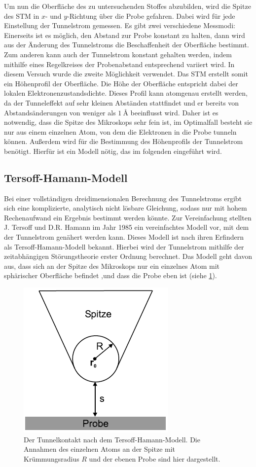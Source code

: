 \documentclass[
	a4paper,
	12pt,
	pagesize,
	ngerman
]{scrartcl}
\begin{document}
Um nun die Oberfläche des zu untersuchenden Stoffes abzubilden, wird die Spitze des STM in $x$- und $y$-Richtung über die Probe gefahren. Dabei wird für jede Einstellung der Tunnelstrom gemessen. Es gibt zwei verschiedene Messmodi: Einerseits ist es möglich, den Abstand zur Probe konstant zu halten, dann wird aus der Änderung des Tunnelstroms die Beschaffenheit der Oberfläche bestimmt. Zum anderen kann auch der Tunnelstrom konstant gehalten werden, indem mithilfe eines Regelkreises der Probenabstand entsprechend variiert wird. In diesem Versuch wurde die zweite Möglichkeit verwendet. Das STM erstellt somit ein Höhenprofil der Oberfläche. Die Höhe der Oberfläche entspricht dabei der lokalen Elektronenzustandsdichte. Dieses Profil kann atomgenau erstellt werden, da der Tunneleffekt auf sehr kleinen Abständen stattfindet und er bereits von Abstandsänderungen von weniger als $\SI{1}{\angstrom}$ beeinflusst wird. Daher ist es notwendig, dass die Spitze des Mikroskops sehr fein ist, im Optimalfall besteht sie nur aus einem einzelnen Atom, von dem die Elektronen in die Probe tunneln können. Außerdem wird für die Bestimmung des Höhenprofils der Tunnelstrom benötigt. Hierfür ist ein Modell nötig, das im folgenden eingeführt wird.

\subsection{Tersoff-Hamann-Modell}
Bei einer vollständigen dreidimensionalen Berechnung des Tunnelstroms ergibt sich eine komplizierte, analytisch nicht lösbare Gleichung, sodass nur mit hohem Rechenaufwand ein Ergebnis bestimmt werden könnte. Zur Vereinfachung stellten J. Tersoff und D.R. Hamann im Jahr 1985 ein vereinfachtes Modell vor, mit dem der Tunnelstrom genähert werden kann. Dieses Modell ist nach ihren Erfindern als Tersoff-Hamann-Modell bekannt. Hierbei wird der Tunnelstrom mithilfe der zeitabhängigen Störungstheorie erster Ordnung berechnet. Das Modell geht davon aus, dass sich an der Spitze des Mikroskops nur ein einzelnes Atom mit sphärischer Oberfläche befindet ,und dass die Probe eben ist (siehe \cref{spitze}).

\begin{figure}[h!]
	\centering
	\includegraphics[scale=0.8]{spitze.png}
	\caption{Der Tunnelkontakt nach dem Tersoff-Hamann-Modell. Die Annahmen des einzelnen Atoms an der Spitze mit Krümmungsradius $R$ und der ebenen Probe sind hier dargestellt.}
	\label{spitze}
\end{figure}
\end{document}
